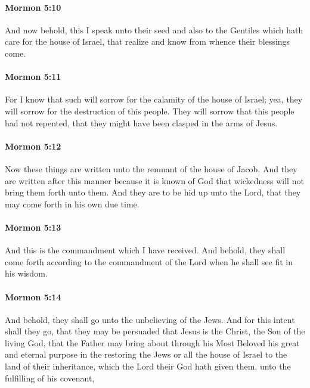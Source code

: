 		\paragraph{Mormon 5:10} %
			\label{MORMON-5-10}

			And now behold, this I speak unto their seed
			and also to the Gentiles which hath care for the house of Israel,
			that realize and know from whence their blessings come.

		\paragraph{Mormon 5:11} %
			\label{MORMON-5-11}

			For I know that such will sorrow for the calamity of the house of Israel;
			yea, they will sorrow for the destruction of this people.
			They will sorrow that this people had not repented,
			that they might have been clasped in the arms of Jesus.

		\paragraph{Mormon 5:12} %
			\label{MORMON-5-12}

			Now these things are written unto the remnant of the house of Jacob.
			And they are written after this manner
			because it is known of God
			that wickedness will not bring them forth unto them.
			And they are to be hid up unto the Lord,
			that they may come forth in his own due time.

		\paragraph{Mormon 5:13} %
			\label{MORMON-5-13}

			And this is the commandment which I have received.
			And behold, they shall come forth according to the commandment of the Lord
			when he shall see fit in his wisdom.

		\paragraph{Mormon 5:14} %
			\label{MORMON-5-14}

			And behold, they shall go unto the unbelieving of the Jews.
			And for this intent shall they go,
			that they may be persuaded that Jesus is the Christ,
			the Son of the living God,
			that the Father may bring about through his Most Beloved
			his great and eternal purpose
			in the restoring the Jews or all the house of Israel
			to the land of their inheritance,
			which the Lord their God hath given them,
			unto the fulfilling of his covenant,

